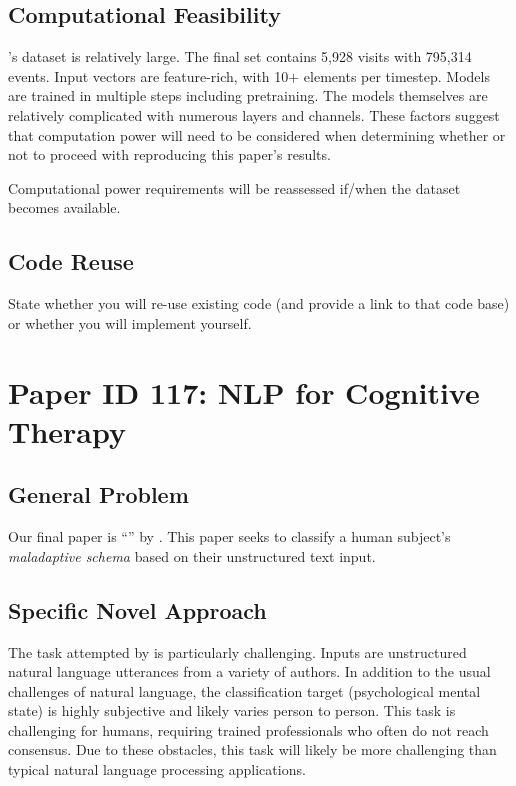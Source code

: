 \documentclass[11pt,a4paper]{article}
\begin{document}
{\subsection{Computational Feasibility}

\citeauthor{zhang_2019}'s \citeyearpar{zhang_2019} dataset is relatively large. The final set contains 5,928 visits with 795,314 events. Input vectors are feature-rich, with 10+ elements per timestep. Models are trained in multiple steps including pretraining. The models themselves are relatively complicated with numerous layers and channels. These factors suggest that computation power will need to be considered when determining whether or not to proceed with reproducing this paper's results. 

Computational power requirements will be reassessed if/when the dataset becomes available. 

\subsection{Code Reuse}
State whether you will re-use existing code (and provide a link to that code base) or whether you will implement yourself.

\section{Paper ID 117: NLP for Cognitive Therapy}
\subsection{General Problem}
Our final paper is ``'' by \citeauthor*{burger_2021}. This paper seeks to classify a human subject's \emph{maladaptive schema} based on their unstructured text input. 

\subsection{Specific Novel Approach}
The task attempted by \citet{burger_2021} is particularly challenging. Inputs are unstructured natural language utterances from a variety of authors. In addition to the usual challenges of natural language, the classification target (psychological mental state) is highly subjective and likely varies person to person. This task is challenging for humans, requiring trained professionals who often do not reach consensus. Due to these obstacles, this task will likely be more challenging than typical natural language processing applications. 

}
\end{document}
